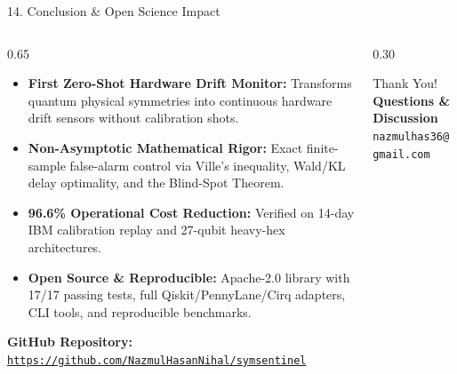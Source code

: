 \documentclass[aspectratio=169, 10pt]{beamer}
\begin{document}
\begin{frame}{14. Conclusion \& Open Science Impact}
    \begin{columns}[T]
        \begin{column}{0.65\textwidth}
            \begin{itemize}
                \item \textbf{First Zero-Shot Hardware Drift Monitor:} Transforms quantum physical symmetries into continuous hardware drift sensors without calibration shots.
                \item \textbf{Non-Asymptotic Mathematical Rigor:} Exact finite-sample false-alarm control via Ville's inequality, Wald/KL delay optimality, and the Blind-Spot Theorem.
                \item \textbf{96.6\% Operational Cost Reduction:} Verified on 14-day IBM calibration replay and 27-qubit heavy-hex architectures.
                \item \textbf{Open Source \& Reproducible:} Apache-2.0 library with 17/17 passing tests, full Qiskit/PennyLane/Cirq adapters, CLI tools, and reproducible benchmarks.
            \end{itemize}
            \vspace{0.4cm}
            \begin{center}
                \textbf{GitHub Repository:} \href{https://github.com/NazmulHasanNihal/symsentinel}{\texttt{https://github.com/NazmulHasanNihal/symsentinel}}
            \end{center}
        \end{column}
        \begin{column}{0.30\textwidth}
            \begin{exampleblock}{Thank You!}
                \centering
                \Large \textbf{Questions \& Discussion}\\
                \vspace{0.3cm}
                \normalsize \texttt{nazmulhas36@gmail.com}
            \end{exampleblock}
        \end{column}
    \end{columns}
\end{frame}
\end{document}
